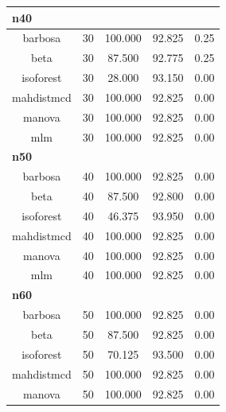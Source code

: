 \documentclass[
]{article}
\begin{document}
\begin{table}
\begin{tabular}[t]{c|c|c|c|c}
\hline
\multicolumn{5}{l}{\textbf{n40}}\\
\hline
\hspace{1em}barbosa & 30 & 100.000 & 92.825 & 0.25\\
\hline
\hspace{1em}beta & 30 & 87.500 & 92.775 & 0.25\\
\hline
\hspace{1em}isoforest & 30 & 28.000 & 93.150 & 0.00\\
\hline
\hspace{1em}mahdistmcd & 30 & 100.000 & 92.825 & 0.00\\
\hline
\hspace{1em}manova & 30 & 100.000 & 92.825 & 0.00\\
\hline
\hspace{1em}mlm & 30 & 100.000 & 92.825 & 0.00\\
\hline
\multicolumn{5}{l}{\textbf{n50}}\\
\hline
\hspace{1em}barbosa & 40 & 100.000 & 92.825 & 0.00\\
\hline
\hspace{1em}beta & 40 & 87.500 & 92.800 & 0.00\\
\hline
\hspace{1em}isoforest & 40 & 46.375 & 93.950 & 0.00\\
\hline
\hspace{1em}mahdistmcd & 40 & 100.000 & 92.825 & 0.00\\
\hline
\hspace{1em}manova & 40 & 100.000 & 92.825 & 0.00\\
\hline
\hspace{1em}mlm & 40 & 100.000 & 92.825 & 0.00\\
\hline
\multicolumn{5}{l}{\textbf{n60}}\\
\hline
\hspace{1em}barbosa & 50 & 100.000 & 92.825 & 0.00\\
\hline
\hspace{1em}beta & 50 & 87.500 & 92.825 & 0.00\\
\hline
\hspace{1em}isoforest & 50 & 70.125 & 93.500 & 0.00\\
\hline
\hspace{1em}mahdistmcd & 50 & 100.000 & 92.825 & 0.00\\
\hline
\hspace{1em}manova & 50 & 100.000 & 92.825 & 0.00\\

\end{tabular}
\end{table}
\end{document}
